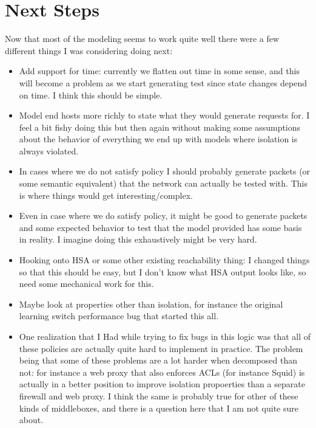 \documentclass[11pt]{article}
\begin{document}
{\section{Next Steps}
Now that most of the modeling seems to work quite well there were a few different things I was considering doing next:
\begin{itemize}
\item Add support for time: currently we flatten out time in some sense, and this will become a problem as we start generating 
test since state changes depend on time. I think this should be simple.
\item Model end hosts more richly to state what they would generate requests for. I feel a bit fishy doing this but then again without making
    some assumptions about the behavior of everything we end up with models where isolation is always violated.
\item In cases where we do not satisfy policy I should probably generate packets (or some semantic equivalent) that the network can
actually be tested with. This is where things would get interesting/complex.
\item Even in case where we do satisfy policy, it might be good to generate packets and some expected behavior to test that the model
provided has some basis in reality. I imagine doing this exhaustively might be very hard.
\item Hooking onto HSA or some other existing reachability thing: I changed things so that this should be easy, but I don't know what HSA output
    looks like, so need some mechanical work for this.
\item Maybe look at properties other than isolation, for instance the original learning switch performance bug that started this all.
\item One realization that I Had while trying to fix bugs in this logic was that all of these policies are actually quite hard to implement in practice. The
problem being that some of these problems are a lot harder when decomposed than not: for instance a web proxy that also enforces ACLs (for instance Squid) is 
actually in a better position to improve isolation propoerties than a separate firewall and web proxy. I think the same is probably true for other of these kinds
of middleboxes, and there is a question here that I am not quite sure about.
\end{itemize} 
}

\end{document}
